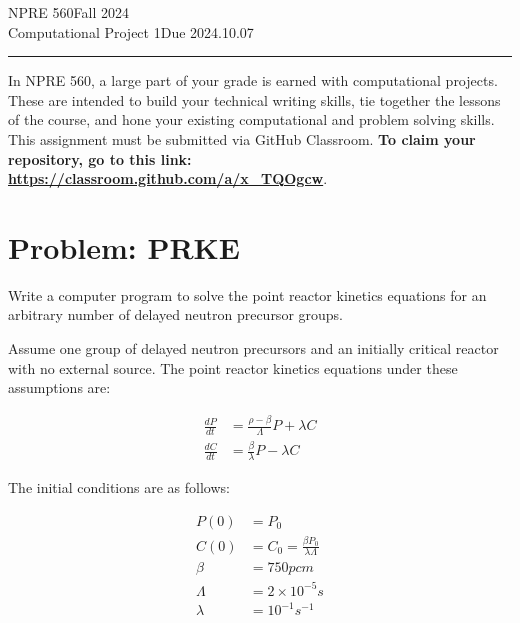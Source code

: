 \documentclass{article}
\newcommand{\class}{NPRE 560}
\newcommand{\term}{Fall 2024}
\newcommand{\assignment}{Computational Project 1}
\newcommand{\duedate}{2024.10.07}
\begin{document}
 


\class \hfill \term \\
\assignment \hfill Due \duedate\\
\rule[1ex]{\textwidth}{.1pt}


In \class, a large part of your grade is earned with computational projects. 
These are intended to build your technical writing skills, tie together the 
lessons of the course, and hone your existing computational and problem solving 
skills. This assignment must be submitted via GitHub Classroom. \textbf{To claim your 
repository, go to this link: \url{https://classroom.github.com/a/x_TQOgcw}}.

\section{Problem: PRKE}

Write a computer program to solve the point reactor kinetics equations for an 
arbitrary number of delayed neutron precursor groups.  

Assume one group of delayed neutron precursors and an initially critical 
                reactor with no external source. The point reactor kinetics 
                equations under these assumptions are:

\begin{align}
        \frac{dP}{dt} &= \frac{\rho - \beta}{\Lambda}P + \lambda C\\
        \frac{dC}{dt} &= \frac{\beta}{\lambda}P - \lambda C
\end{align}

The initial conditions are as follows:

\begin{align}
        P(0) &=P_0\\
        C(0) &= C_0 = \frac{\beta P_0}{\lambda\Lambda}\\
        \beta &= 750pcm\\
        \Lambda &= 2\times 10^{-5}s\\
        \lambda &= 10^{-1}s^{-1}
\end{align}
\end{document}
